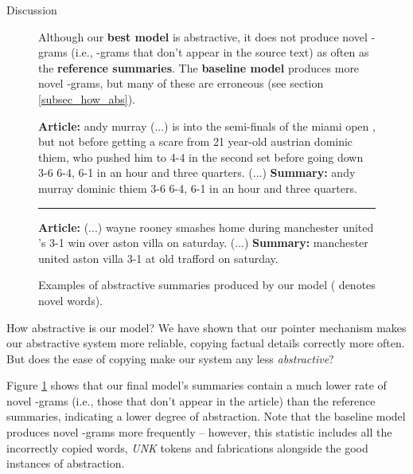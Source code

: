 \documentclass[11pt,a4paper]{article}
\begin{document}
\begin{section}{Discussion}
\begin{figure}[t]
 \caption{Although our \textcolor{gblue}{\textbf{best model}} is abstractive, it does not produce novel -grams (i.e., -grams that don't appear in the source text) as often as the \textcolor{ggreen}{\textbf{reference summaries}}. The \textcolor{gyellow!90!black}{\textbf{baseline model}} produces more novel -grams, but many of these are erroneous (see section \ref{subsec_how_abs}).}
\label{fig_abstractiveness}
\end{figure}

\begin{figure}[h]
\begin{boxedminipage}{\columnwidth}
\small
\textbf{Article:} andy murray (...) is into the semi-finals of the miami open , but not before getting a scare from 21 year-old austrian dominic thiem, who pushed him to 4-4 in the second set before going down 3-6 6-4, 6-1 in an hour and three quarters. (...) \newline
\textbf{Summary:} andy murray  dominic thiem 3-6 6-4, 6-1 in an hour and three quarters.
\newline \rule{\columnwidth}{0.4pt}
\textbf{Article:} (...) wayne rooney smashes home during manchester united 's 3-1 win over aston villa on saturday. (...) \newline
\textbf{Summary:} manchester united  aston villa 3-1 at old trafford on saturday.
\end{boxedminipage}
\caption{Examples of abstractive summaries produced by our model ( denotes novel words).}
\label{fig_abs_my_exs}
\end{figure}

\begin{subsection}{How abstractive is our model?}
\label{subsec_how_abs}
We have shown that our pointer mechanism makes our abstractive system more reliable, copying factual details correctly more often.
But does the ease of copying make our system any less \textit{abstractive}?

Figure \ref{fig_abstractiveness} shows that our final model's summaries contain a much lower rate of novel -grams (i.e., those that don't appear in the article) than the reference summaries, indicating a lower degree of abstraction.
Note that the baseline model produces novel -grams more frequently -- however, this statistic includes all the incorrectly copied words, \textit{UNK} tokens and fabrications alongside the good instances of abstraction.


\end{subsection}
\end{section}
\end{document}
